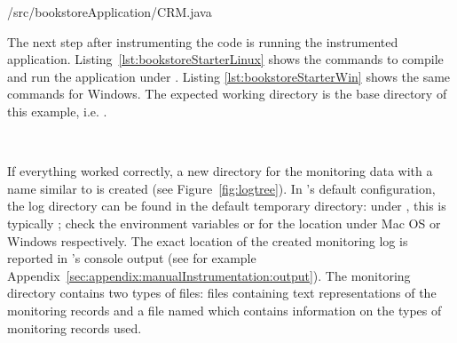 \setJavaCodeListing
%
{\manualInstrumentedBookstoreApplicationDir/src/bookstoreApplication/CRM.java}


\noindent %
The next step after instrumenting the code is running the instrumented application. Listing~\ref{lst:bookstoreStarterLinux} shows the commands to compile and run the application under \UnixLikeSystems{}. Listing \ref{lst:bookstoreStarterWin} shows the same commands for Windows. The expected working directory is the base directory of this example, i.e. %
 \dir{\manualInstrumentedBookstoreApplicationDirDistro{}/}.

\enlargethispage{1cm}

\setBashListing 		
	



\pagebreak



\quad\

\noindent If everything worked correctly, a new directory for the monitoring data with a name similar to  is created %
(see Figure~\ref{fig:logtree}). %
In \Kieker's default configuration, the log directory can be found in the default temporary directory: %
under \UnixLikeSystems{}, this is typically ; %
check the environment variables  or  for the location under Mac OS or Windows respectively. %
The exact location of the created monitoring log is reported in \Kieker's console output (see for example Appendix~\ref{sec:appendix:manualInstrumentation:output}).
The monitoring directory contains two types of files:  files containing text representations of the monitoring records and a %
file named  which contains information on the types of monitoring records used. 

